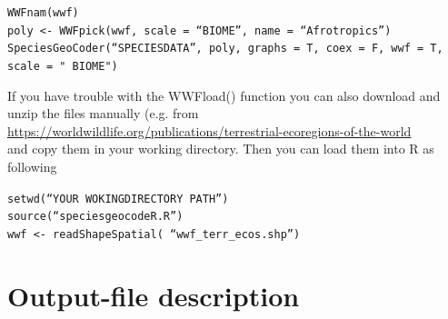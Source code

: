 \documentclass[a4paper,titlepage,11pt]{scrreprt}
\begin{document}
\texttt{WWFnam(wwf)}\\
\texttt{poly \textless- WWFpick(wwf,  scale = ``BIOME'', name  = ``Afrotropics'')}\\
\texttt{SpeciesGeoCoder(``SPECIESDATA'', poly,  graphs = T, coex = F, wwf = T, scale = " BIOME") }

If you have trouble with the WWFload() function you can also download and unzip the files manually  (e.g. from\\
 \url{https://worldwildlife.org/publications/terrestrial-ecoregions-of-the-world}\\
 and copy them in your working directory. Then you can load them into R as following

\texttt{setwd(``YOUR WOKINGDIRECTORY PATH'')}\\
\texttt{source(``speciesgeocodeR.R'')}\\
\texttt{wwf \textless- readShapeSpatial( ``wwf\_terr\_ecos.shp'')}

\chapter{Output-file description} \label{output}
\end{document}
